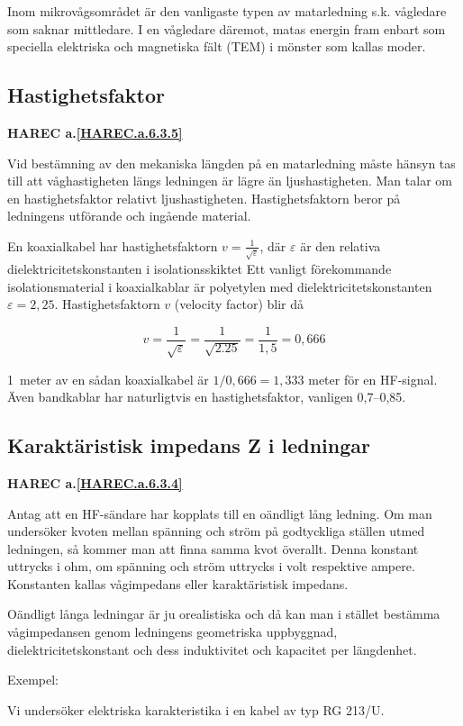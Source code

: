 Inom mikrovågsområdet är den vanligaste typen av matarledning
s.k. vågledare som saknar mittledare. I en vågledare däremot, matas
energin fram enbart som speciella elektriska och magnetiska fält (TEM)
i mönster som kallas moder.

\subsection{Hastighetsfaktor}
\textbf{
HAREC a.\ref{HAREC.a.6.3.5}\label{myHAREC.a.6.3.5}
}

Vid bestämning av den mekaniska längden på en matarledning måste
hänsyn tas till att våghastigheten längs ledningen är lägre än
ljushastigheten. Man talar om en hastighetsfaktor relativt
ljushastigheten. Hastighetsfaktorn beror på ledningens utförande och
ingående material.

En koaxialkabel har hastighetsfaktorn \(v =
\frac{1}{\sqrt{\varepsilon}}\), där \(\varepsilon\) är den relativa
dielektricitetskonstanten i isolationsskiktet Ett vanligt förekommande
isolationsmaterial i koaxialkablar är polyetylen med
dielektricitetskonstanten \(\varepsilon = 2,25\).  Hastighetsfaktorn
\(v\) (velocity factor) blir då

\[
v = \frac{1}{\sqrt{\varepsilon}} = \frac{1}{\sqrt{2.25}} = \frac{1}{1,5} = 0,666
\]

1~meter av en sådan koaxialkabel är \(1/0,666 = 1,333\) meter för en HF-signal.
Även bandkablar har naturligtvis en hastighetsfaktor, vanligen 0,7--0,85.

\subsection{Karaktäristisk impedans Z i ledningar}
\textbf{
HAREC a.\ref{HAREC.a.6.3.4}\label{myHAREC.a.6.3.4}
}

Antag att en HF-sändare har kopplats till en oändligt lång ledning. Om
man undersöker kvoten mellan spänning och ström på godtyckliga ställen
utmed ledningen, så kommer man att finna samma kvot överallt.  Denna
konstant uttrycks i ohm, om spänning och ström uttrycks i volt
respektive ampere. Konstanten kallas vågimpedans eller karaktäristisk
impedans.

Oändligt långa ledningar är ju orealistiska och då kan man i stället
bestämma vågimpedansen genom ledningens geometriska uppbyggnad,
dielektricitetskonstant och dess induktivitet och kapacitet per
längdenhet.

Exempel:

Vi undersöker elektriska karakteristika i en kabel av typ RG 213/U.

